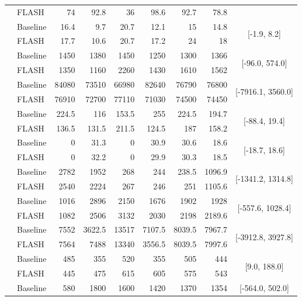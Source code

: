 \documentclass{article} %
\begin{document}
\begin{table}[H]
{\begin{tabular}{@{}ll*{5}{r}rc@{}}
 & FLASH & 74 & 92.8 & 36 & 98.6 & 92.7 & 78.8 &  \\
\addlinespace[1pt]
\multirow{2}{*}{Breakout} & Baseline & 16.4 & 9.7 & 20.7 & 12.1 & 15 & 14.8 & \multirow{2}{*}{[-1.9, 8.2]} \\
 & FLASH & 17.7 & 10.6 & 20.7 & 17.2 & 24 & 18 &  \\
\addlinespace[1pt]
\multirow{2}{*}{ChopperCommand} & Baseline & 1450 & 1380 & 1450 & 1250 & 1300 & 1366 & \multirow{2}{*}{[-96.0, 574.0]} \\
 & FLASH & 1350 & 1160 & 2260 & 1430 & 1610 & 1562 &  \\
\addlinespace[1pt]
\multirow{2}{*}{CrazyClimber} & Baseline & 84080 & 73510 & 66980 & 82640 & 76790 & 76800 & \multirow{2}{*}{[-7916.1, 3560.0]} \\
 & FLASH & 76910 & 72700 & 77110 & 71030 & 74500 & 74450 &  \\
\addlinespace[1pt]
\multirow{2}{*}{DemonAttack} & Baseline & 224.5 & 116 & 153.5 & 255 & 224.5 & 194.7 & \multirow{2}{*}{[-88.4, 19.4]} \\
 & FLASH & 136.5 & 131.5 & 211.5 & 124.5 & 187 & 158.2 &  \\
\addlinespace[1pt]
\multirow{2}{*}{Freeway} & Baseline & 0 & 31.3 & 0 & 30.9 & 30.6 & 18.6 & \multirow{2}{*}{[-18.7, 18.6]} \\
 & FLASH & 0 & 32.2 & 0 & 29.9 & 30.3 & 18.5 &  \\
\addlinespace[1pt]
\multirow{2}{*}{Frostbite} & Baseline & 2782 & 1952 & 268 & 244 & 238.5 & 1096.9 & \multirow{2}{*}{[-1341.2, 1314.8]} \\
 & FLASH & 2540 & 2224 & 267 & 246 & 251 & 1105.6 &  \\
\addlinespace[1pt]
\multirow{2}{*}{Gopher} & Baseline & 1016 & 2896 & 2150 & 1676 & 1902 & 1928 & \multirow{2}{*}{[-557.6, 1028.4]} \\
 & FLASH & 1082 & 2506 & 3132 & 2030 & 2198 & 2189.6 &  \\
\addlinespace[1pt]
\multirow{2}{*}{Hero} & Baseline & 7552 & 3622.5 & 13517 & 7107.5 & 8039.5 & 7967.7 & \multirow{2}{*}{[-3912.8, 3927.8]} \\
 & FLASH & 7564 & 7488 & 13340 & 3556.5 & 8039.5 & 7997.6 &  \\
\addlinespace[1pt]
\multirow{2}{*}{Jamesbond} & Baseline & 485 & 355 & 520 & 355 & 505 & 444 & \multirow{2}{*}{[9.0, 188.0]} \\
 & FLASH & 445 & 475 & 615 & 605 & 575 & 543 &  \\
\addlinespace[1pt]
\multirow{2}{*}{Kangaroo} & Baseline & 580 & 1800 & 1600 & 1420 & 1370 & 1354 & \multirow{2}{*}{[-564.0, 502.0]} \\

\end{tabular}}
\end{table}
\end{document}
